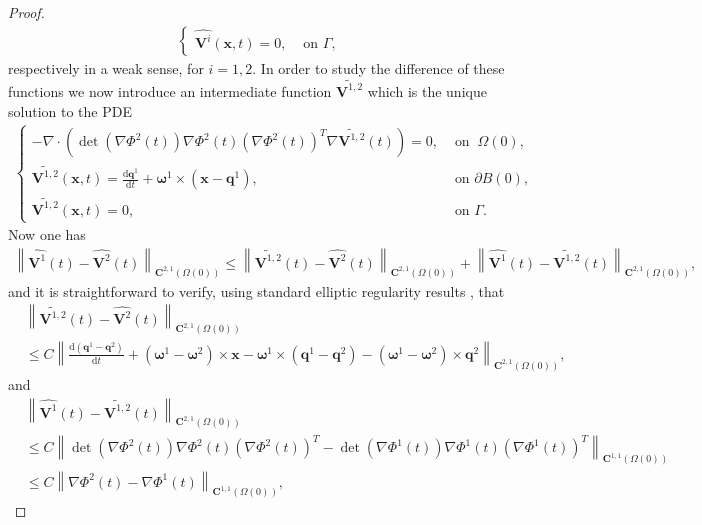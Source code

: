 \documentclass[a4paper]{amsart}
\numberwithin{equation}{section}
\newcommand{\grad}{\nabla}
\newcommand{\Div}{\nabla \cdot}
\theoremstyle{plain}
\newcommand{\mbf}[1]{\mathbf{#1}}
\begin{document}
\begin{proof}
\begin{gather*}
\begin{cases}
			\widehat{\mbf{V}^i}(\mbf{x},t) = 0, &\text{ on } \Gamma,
		\end{cases}
	\end{gather*}
	respectively in a weak sense, for $i = 1,2$.
	In order to study the difference of these functions we now introduce an intermediate function $\widetilde{\mbf{V}^{1,2}}$ which is the unique solution to the PDE
	\begin{gather*}
	\begin{cases}
		-\Div \left(\det(\grad\Phi^2(t)) \grad\Phi^2(t) (\grad\Phi^2(t))^{T} \grad \widetilde{\mbf{V}^{1,2}}(t) \right) = 0,& \text{ on }\ \Omega(0),\\
		\widetilde{\mbf{V}^{1,2}}(\mbf{x},t) = \frac{\mathrm{d}\mbf{q}^1}{\mathrm{d}t} + \boldsymbol{\omega}^1 \times (\mbf{x} - \mbf{q}^1),& \text{ on } \partial B(0),\\
		\widetilde{\mbf{V}^{1,2}}(\mbf{x},t) = 0,& \text{ on } \Gamma.
	\end{cases}
	\end{gather*}
	Now one has
	\begin{align*}\left\|\widehat{\mbf{V}^1}(t) - \widehat{\mbf{V}^2}(t) \right\|_{\mbf{C}^{2,1}(\Omega(0))} \leq \left\|\widetilde{\mbf{V}^{1,2}}(t) - \widehat{\mbf{V}^2}(t) \right\|_{\mbf{C}^{2,1}(\Omega(0))} + \left\|\widehat{\mbf{V}^1}(t) - \widetilde{\mbf{V}^{1,2}}(t) \right\|_{\mbf{C}^{2,1}(\Omega(0))},
	\end{align*}
	and it is straightforward to verify, using standard elliptic regularity results \cite{gilbarg1977elliptic}, that
	\begin{align*}
		&\left\|\widetilde{\mbf{V}^{1,2}}(t) - \widehat{\mbf{V}^2}(t) \right\|_{\mbf{C}^{2,1}(\Omega(0))}\\
        &\leq C \left\| \frac{\mathrm{d}(\mbf{q}^1-\mbf{q}^2)}{\mathrm{d}t} + (\boldsymbol{\omega}^1 - \boldsymbol{\omega}^2)\times \mbf{x} - \boldsymbol{\omega}^1 \times (\mbf{q}^1 - \mbf{q}^2) - (\boldsymbol{\omega}^1 - \boldsymbol{\omega}^2)\times \mbf{q}^2  \right\|_{\mbf{C}^{2,1}(\Omega(0))},
	\end{align*}
	and
	\begin{align*}
		&\left\|\widehat{\mbf{V}^1}(t) - \widetilde{\mbf{V}^{1,2}}(t) \right\|_{\mbf{C}^{2,1}(\Omega(0))}\\
		&\leq C \left\|\det(\grad\Phi^2(t)) \grad\Phi^2(t) (\grad\Phi^2(t))^{T} - \det(\grad\Phi^1(t)) \grad\Phi^1(t)(\grad\Phi^1(t))^{T} \right\|_{\mbf{C}^{1,1}(\Omega(0))}\\
		&\leq C \left\| \grad\Phi^2(t) - \grad\Phi^1(t) \right\|_{\mbf{C}^{1,1}(\Omega(0))},

\end{align*}
\end{proof}
\end{document}
